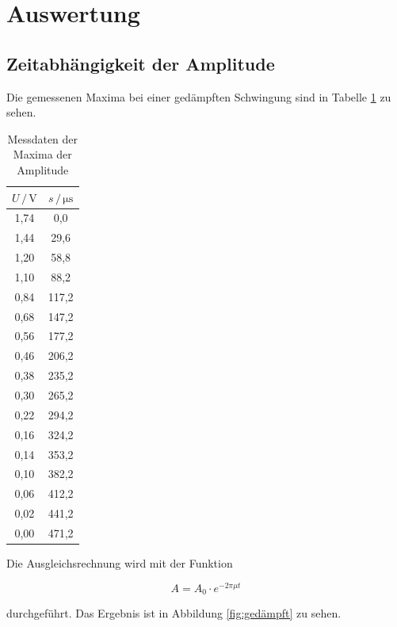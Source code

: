 \section{Auswertung}
\label{sec:Auswertung}

\subsection{Zeitabhängigkeit der Amplitude}

Die gemessenen Maxima bei einer gedämpften Schwingung sind 
in Tabelle \ref{tab:Messdaten1} zu sehen. 

\begin{table}
\centering
\caption{Messdaten der Maxima der Amplitude}
\label{tab:Messdaten1}
\begin{tabular}{c c}
\toprule
$U \,/\, \si{\volt}$ & $s \,/\, \si{\micro\second}$\\
\midrule
1,74 &   0,0\\
1,44 &  29,6\\
1,20 &  58,8\\
1,10 &  88,2\\
0,84 & 117,2\\
0,68 & 147,2\\
0,56 & 177,2\\
0,46 & 206,2\\
0,38 & 235,2\\
0,30 & 265,2\\
0,22 & 294,2\\ 
0,16 & 324,2\\
0,14 & 353,2\\
0,10 & 382,2\\
0,06 & 412,2\\
0,02 & 441,2\\
0,00 & 471,2\\
\bottomrule
\end{tabular}
\end{table} 

Die Ausgleichsrechnung wird mit der Funktion 

\begin{equation*}
A = A_0 \cdot e^{-2\pi\mu t}
\end{equation*}

durchgeführt. Das Ergebnis ist in Abbildung \ref{fig:gedämpft} zu sehen. 

